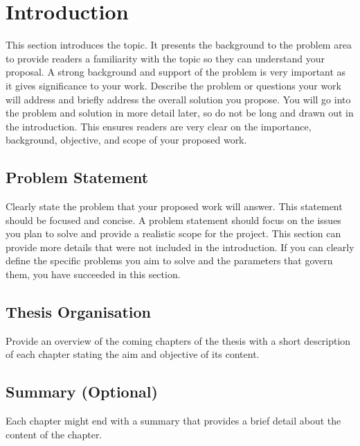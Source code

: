 
\chapter{Introduction}

\begin{justify}
This section introduces the topic.  It presents the background to the problem area to provide readers a familiarity with the topic so they can understand your proposal.  A strong background and support of the problem is very important as it gives significance to your work.  Describe the problem or questions your work will address and briefly address the overall solution you propose.  You will go into the problem and solution in more detail later, so do not be long and drawn out in the introduction.  This ensures readers are very clear on the importance, background, objective, and scope of your proposed work.
\end{justify}

\section{Problem Statement}
\begin{justify}
Clearly state the problem that your proposed work will answer.  This statement should be focused and concise.  A problem statement should focus on the issues you plan to solve and provide a realistic scope for the project.  This section can provide more details that were not included in the introduction.  If you can clearly define the specific problems you aim to solve and the parameters that govern them, you have succeeded in this section.

\end{justify}

\section{Thesis Organisation}
\begin{justify}
Provide an overview of the coming chapters of the thesis with a short description of each chapter stating the aim and objective of its content.
\end{justify}

\section{Summary (Optional)}
\begin{justify}
Each chapter might end with a summary that provides a brief detail about the content of the chapter.
\end{justify}

\clearpage

